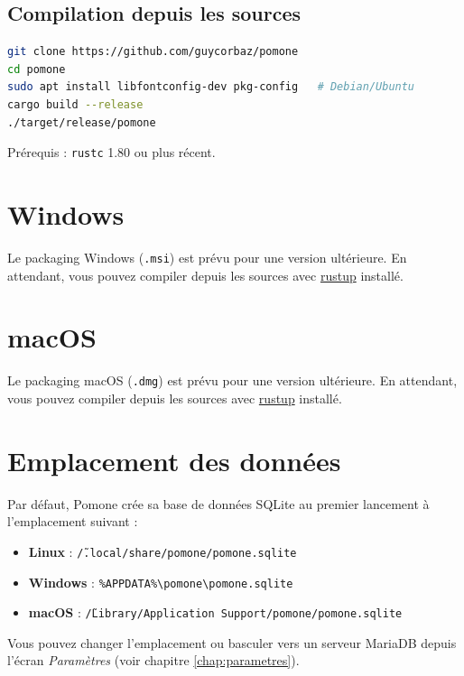 \subsection{Compilation depuis les sources}

\begin{lstlisting}[language=bash]
git clone https://github.com/guycorbaz/pomone
cd pomone
sudo apt install libfontconfig-dev pkg-config   # Debian/Ubuntu
cargo build --release
./target/release/pomone
\end{lstlisting}

Prérequis : \texttt{rustc} 1.80 ou plus récent.

\section{Windows}

\begin{warnbox}
Le packaging Windows (\texttt{.msi}) est prévu pour une version ultérieure. En attendant, vous pouvez compiler depuis les sources avec \href{https://rustup.rs/}{rustup} installé.
\end{warnbox}

\section{macOS}

\begin{warnbox}
Le packaging macOS (\texttt{.dmg}) est prévu pour une version ultérieure. En attendant, vous pouvez compiler depuis les sources avec \href{https://rustup.rs/}{rustup} installé.
\end{warnbox}

\section{Emplacement des données}

Par défaut, Pomone crée sa base de données SQLite au premier lancement à l'emplacement suivant :

\begin{itemize}
  \item \textbf{Linux} : \texttt{\~/.local/share/pomone/pomone.sqlite}
  \item \textbf{Windows} : \texttt{\%APPDATA\%\textbackslash pomone\textbackslash pomone.sqlite}
  \item \textbf{macOS} : \texttt{\~/Library/Application Support/pomone/pomone.sqlite}
\end{itemize}

Vous pouvez changer l'emplacement ou basculer vers un serveur MariaDB depuis l'écran \emph{Paramètres} (voir chapitre \ref{chap:parametres}).
